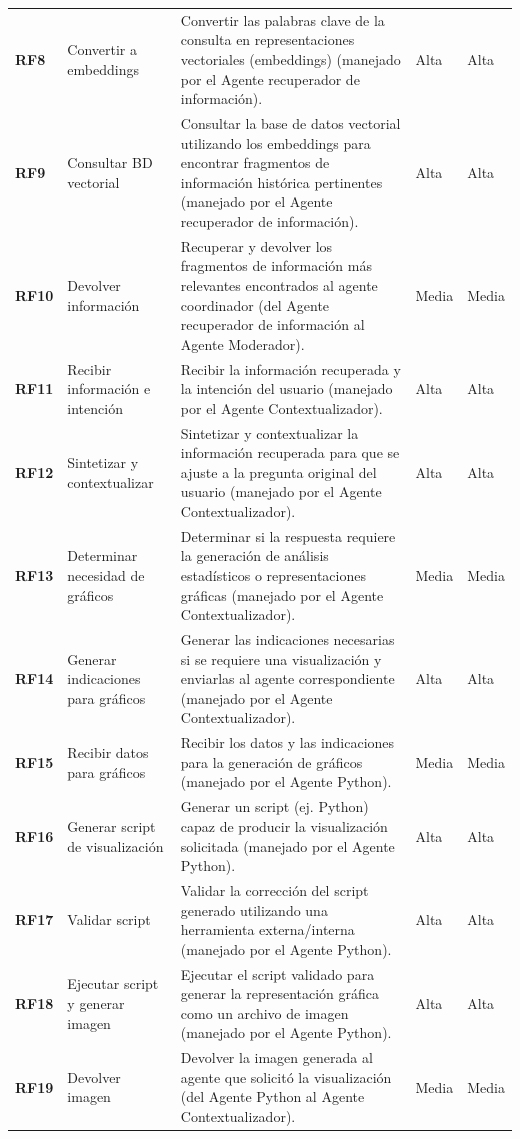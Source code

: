 \begin{longtable}{@{}l >{\raggedright\arraybackslash}p{4cm} >{\raggedright\arraybackslash}p{7cm} l l@{}}
	\textbf{RF8} & Convertir a embeddings & Convertir las palabras clave de la consulta en representaciones vectoriales (embeddings) (manejado por el Agente recuperador de información). & Alta & Alta \\ %
	\textbf{RF9} & Consultar BD vectorial & Consultar la base de datos vectorial utilizando los embeddings para encontrar fragmentos de información histórica pertinentes (manejado por el Agente recuperador de información). & Alta & Alta \\ %
	\textbf{RF10} & Devolver información & Recuperar y devolver los fragmentos de información más relevantes encontrados al agente coordinador (del Agente recuperador de información al Agente Moderador). & Media & Media \\ %
	\midrule
	
	\textbf{RF11} & Recibir información e intención & Recibir la información recuperada y la intención del usuario (manejado por el Agente Contextualizador). & Alta & Alta \\ %
	\textbf{RF12} & Sintetizar y contextualizar & Sintetizar y contextualizar la información recuperada para que se ajuste a la pregunta original del usuario (manejado por el Agente Contextualizador). & Alta & Alta \\ %
	\textbf{RF13} & Determinar necesidad de gráficos & Determinar si la respuesta requiere la generación de análisis estadísticos o representaciones gráficas (manejado por el Agente Contextualizador). & Media & Media \\ %
	\textbf{RF14} & Generar indicaciones para gráficos & Generar las indicaciones necesarias si se requiere una visualización y enviarlas al agente correspondiente (manejado por el Agente Contextualizador). & Alta & Alta \\ %
	\midrule
	
	\textbf{RF15} & Recibir datos para gráficos & Recibir los datos y las indicaciones para la generación de gráficos (manejado por el Agente Python). & Media & Media \\ %
	\textbf{RF16} & Generar script de visualización & Generar un script (ej. Python) capaz de producir la visualización solicitada (manejado por el Agente Python). & Alta & Alta \\ %
	\textbf{RF17} & Validar script & Validar la corrección del script generado utilizando una herramienta externa/interna (manejado por el Agente Python). & Alta & Alta \\ %
	\textbf{RF18} & Ejecutar script y generar imagen & Ejecutar el script validado para generar la representación gráfica como un archivo de imagen (manejado por el Agente Python). & Alta & Alta \\ %
	\textbf{RF19} & Devolver imagen & Devolver la imagen generada al agente que solicitó la visualización (del Agente Python al Agente Contextualizador). & Media & Media \\ %
	\midrule
	

\end{longtable}
